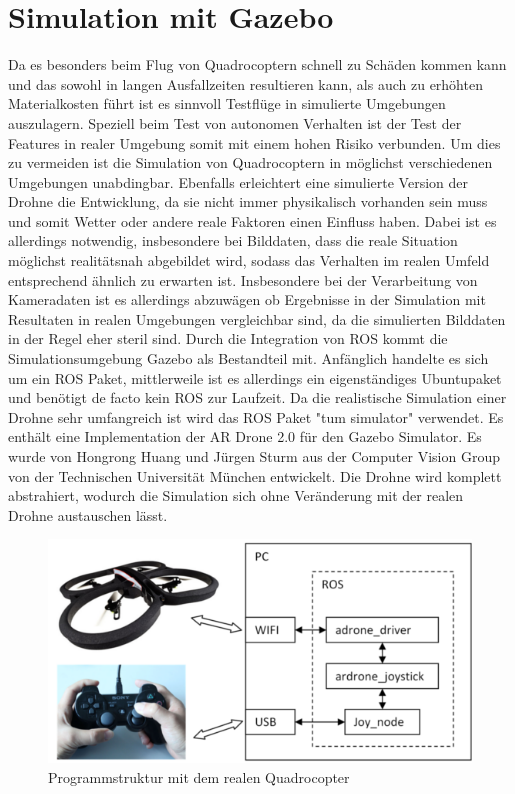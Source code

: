 \section{Simulation mit Gazebo}
Da es besonders beim Flug von Quadrocoptern schnell zu Schäden kommen kann und das sowohl  in langen Ausfallzeiten resultieren kann, als auch zu erhöhten Materialkosten führt ist es sinnvoll Testflüge in simulierte Umgebungen auszulagern. Speziell beim Test von autonomen Verhalten ist der Test der Features in realer Umgebung somit mit einem hohen Risiko verbunden. Um dies zu vermeiden ist die Simulation von Quadrocoptern in möglichst verschiedenen Umgebungen unabdingbar. Ebenfalls erleichtert eine simulierte Version der Drohne die Entwicklung, da sie nicht immer physikalisch vorhanden sein muss und somit Wetter oder andere reale Faktoren einen Einfluss haben. Dabei ist es allerdings notwendig, insbesondere
bei Bilddaten, dass die reale Situation möglichst realitätsnah abgebildet wird, sodass
das Verhalten im realen Umfeld entsprechend ähnlich zu erwarten ist. Insbesondere bei der
Verarbeitung von Kameradaten ist es allerdings abzuwägen ob Ergebnisse in der Simulation
mit Resultaten in realen Umgebungen vergleichbar sind, da die simulierten
Bilddaten in der Regel eher steril sind.\newline
Durch die Integration von ROS kommt die Simulationsumgebung Gazebo als Bestandteil
mit. Anfänglich handelte es sich um ein ROS Paket, mittlerweile ist es allerdings
ein eigenständiges Ubuntupaket und benötigt de facto kein ROS zur Laufzeit.
\newline
Da die realistische Simulation einer Drohne sehr umfangreich ist wird das ROS Paket "tum simulator" verwendet. Es enthält eine Implementation der AR Drone 2.0 für den Gazebo Simulator. Es wurde von Hongrong Huang und Jürgen Sturm
 aus der Computer Vision Group von der Technischen Universität München entwickelt.\cite{tumsim} Die Drohne wird komplett abstrahiert, wodurch die Simulation sich ohne Veränderung mit der realen Drohne austauschen lässt. 
 \begin{figure}[ht]
 	\centering
 	\includegraphics[scale=0.9]{Bilder/real_structure.png}
 	\caption[Programmstruktur mit dem realen Quadrocopter]{Programmstruktur mit dem realen Quadrocopter \cite{real_structure}}
 	
 \end{figure}
